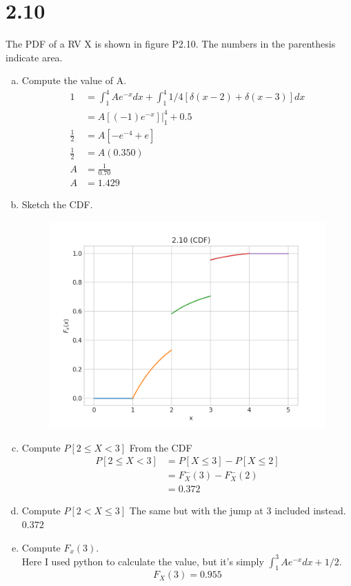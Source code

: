 \documentclass[12pt]{article}
\newcommand{\mysection}[1]{\section*{#1}}
\begin{document}
\mysection{2.10}
The PDF of a RV X is shown in figure P2.10. The numbers in the parenthesis indicate area. 
\begin{enumerate}[(a)]
  \item Compute the value of A.
    \begin{align*}
      1&=\int_1^4 Ae^{-x} dx + \int_1^4 1/4[\delta(x-2)+\delta(x-3)] dx\\
       &=A[(-1)e^{-x}]\big|_1^4 +0.5\\
      \frac{1}{2} &=A[-e^{-4}+e]\\ 
      \frac{1}{2} &=A(0.350)\\ 
       A&=\frac{1}{0.70}\\ 
       A&=1.429
    \end{align*}
  \item Sketch the CDF.\@
    \begin{figure}[H]\centering
      \includegraphics[scale=0.6]{plot_CDF_210}
    \end{figure}
  \item Compute $P[2\leq X<3]$
    From the CDF 
    \begin{align*}
      P[2\leq X<3]&=P[X\leq3]-P[X\leq2]\\
                  &=F_X^-(3)-F_X^-(2)\\
                  &=0.372
    \end{align*} 
  \item Compute $P[2<X\leq 3]$
    The same but with the jump at 3 included instead. \\
    $0.372$

  \item Compute $F_x(3)$.\\
    Here I used python to calculate the value, but it's simply $\int_1^3Ae^{-x}dx+1/2$.
    \[ F_X(3)=0.955 \]
\end{enumerate}
\newpage
\end{document}
